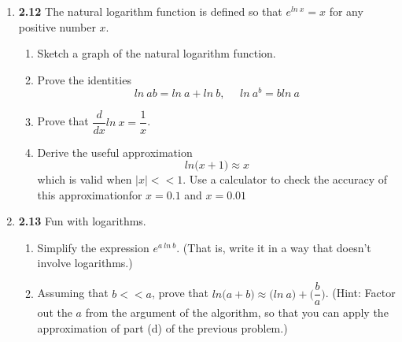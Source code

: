 \documentclass[fleqn]{article}
\begin{document}
\begin{enumerate}
\begin{enumerate}

    \end{enumerate}

    \item \textbf{2.12} The natural logarithm function is defined so that $e^{ln ~ x}=x$ for any positive number $x$.
    \begin{enumerate}
      \item Sketch a graph of the natural logarithm function.


      \item Prove the identities
      $$
        ln ~ ab=ln ~ a+ln ~ b, ~~~~~~ ln ~ a^b=bln ~ a
      $$


      \item Prove that $\dfrac{d}{dx} ln ~ x=\dfrac{1}{x}$.


      \item Derive the useful approximation 
      $$
        ln \bigg( x+1 \bigg) \approx x
      $$
      which is valid when $|x| << 1$. Use a calculator to check the accuracy of this approximationfor $x=0.1$ and $x=0.01$


    \end{enumerate}

    \item \textbf{2.13}  Fun with logarithms.
    \begin{enumerate}
      \item Simplify the expression $e^{a ~ ln ~ b}$. (That is, write it in a way that doesn't involve logarithms.)


      \item Assuming that $b << a$, prove that $ln \bigg( a+b \bigg) \approx \bigg( ln ~ a\bigg)+\bigg( \dfrac{b}{a}\bigg)$.
      (Hint: Factor out the $a$ from the argument of the algorithm, so that you can apply the approximation of part (d)
      of the previous problem.)


\end{enumerate}
\end{enumerate}
\end{document}
